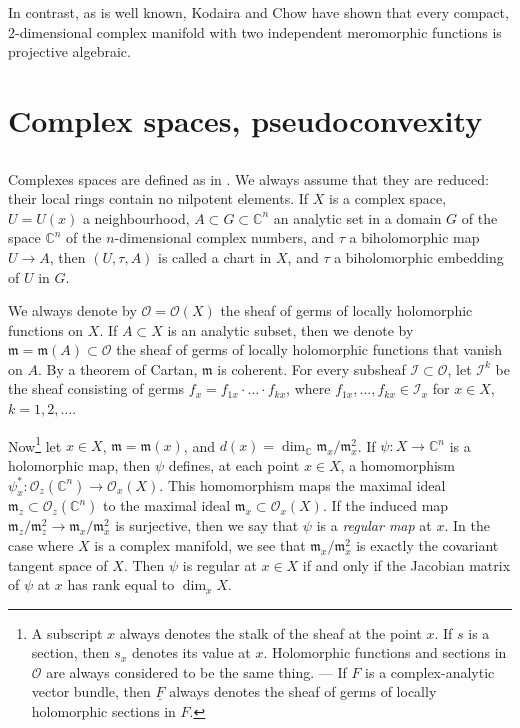 \documentclass{article}
\theoremstyle{plain}
\theoremstyle{definition}
\newcommand{\scr}[1]{{\mathscr{#1}}}
\newcommand{\CC}{\mathbb{C}}
\newcommand{\fk}{\mathfrak}
\begin{document}
In contrast, as is well known, Kodaira and Chow \cite{4} have shown that every compact, $2$-dimensional complex manifold with two independent meromorphic functions is projective algebraic.


\section{Complex spaces, pseudoconvexity}
\label{1}

\subsection{}
\label{1.1}

Complexes spaces are defined as in \cite{10}.
We always assume that they are reduced: their local rings contain no nilpotent elements.
If $X$ is a complex space, $U=U(x)$ a neighbourhood, $A\subset G\subset \CC^n$ an analytic set in a domain $G$ of the space $\CC^n$ of the $n$-dimensional complex numbers, and $\tau$ a biholomorphic map $U\to A$, then $(U,\tau,A)$ is called a chart in $X$, and $\tau$ a biholomorphic embedding of $U$ in $G$.

We always denote by $\scr{O}=\scr{O}(X)$ the sheaf of germs of locally holomorphic functions on $X$.
If $A\subset X$ is an analytic subset, then we denote by $\fk{m}=\fk{m}(A)\subset\scr{O}$ the sheaf of germs of locally holomorphic functions that vanish on $A$.
By a theorem of Cartan, $\fk{m}$ is coherent.
For every subsheaf $\scr{I}\subset\scr{O}$, let $\scr{I}^k$ be the sheaf consisting of germs $f_x=f_{1x}\cdot\ldots\cdot f_{kx}$, where $f_{1x},\ldots,f_{kx}\in\scr{I}_x$ for $x\in X$, $k=1,2,\ldots$.

Now\footnote{
  A subscript $x$ always denotes the stalk of the sheaf at the point $x$.
  If $s$ is a section, then $s_x$ denotes its value at $x$.
  Holomorphic functions and sections in $\scr{O}$ are always considered to be the same thing.
  --- If $F$ is a complex-analytic vector bundle, then $\underline{F}$ always denotes the sheaf of germs of locally holomorphic sections in $F$.
}
let $x\in X$, $\fk{m}=\fk{m}(x)$, and $d(x)=\dim_\CC\fk{m}_x/\fk{m}_x^2$.
If $\psi\colon X\to\CC^n$ is a holomorphic map, then $\psi$ defines, at each point $x\in X$, a homomorphism $\psi_x^*\colon\scr{O}_z(\CC^n)\to\scr{O}_x(X)$.
This homomorphism maps the maximal ideal $\fk{m}_z\subset\scr{O}_z(\CC^n)$ to the maximal ideal $\fk{m}_x\subset\scr{O}_x(X)$.
If the induced map $\fk{m}_z/\fk{m}_z^2\to\fk{m}_x/\fk{m}_x^2$ is surjective, then we say that $\psi$ is a \emph{regular map} at $x$.
In the case where $X$ is a complex manifold, we see that $\fk{m}_x/\fk{m}_x^2$ is exactly the covariant tangent space of $X$.
Then $\psi$ is regular at $x\in X$ if and only if the Jacobian matrix of $\psi$ at $x$ has rank equal to $\dim_x X$.
\end{document}
